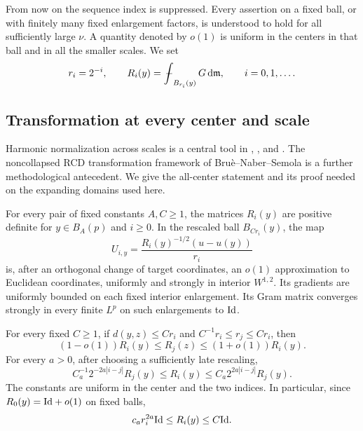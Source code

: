 From now on the sequence index is suppressed.  Every assertion on
a fixed ball, or with finitely many fixed enlargement factors, is
understood to hold for all sufficiently large \(\nu\).  A quantity
denoted by \(o(1)\) is uniform in the centers in that ball and in
all the smaller scales.  We set
\begin{equation}\label{co:dyadic-R}
 r_i=2^{-i},\qquad
 R_i(y)=\fint_{B_{r_i}(y)}G\dd\m,
 \qquad i=0,1,\ldots.
\end{equation}

\subsection{Transformation at every center and scale}

Harmonic normalization across scales is a central tool in
\cite[Theorem~1.32]{CN15}, \cite[Section~7]{CJN21}, and
\cite[Theorem~4.1]{HH24}. The noncollapsed RCD transformation framework of
Bru\`e--Naber--Semola \cite[Section~3.3, Proposition~3.13 and Corollary~3.16]{BNS20}
is a further methodological antecedent. We give the all-center statement and
its proof needed on the expanding domains used here.

\begin{lemma}\label{co:harmonic-normalization}
For every pair of fixed constants \(A,C\ge1\), the matrices \(R_i(y)\) are
positive definite for \(y\in B_A(p)\) and \(i\ge0\).  In the
rescaled ball \(B_{Cr_i}(y)\), the map
\begin{equation}\label{co:normalized-column}
 U_{i,y}=\frac{R_i(y)^{-1/2}(u-u(y))}{r_i}
\end{equation}
is, after an orthogonal change of target coordinates, an
\(o(1)\) approximation to Euclidean coordinates, uniformly and
strongly in interior \(W^{1,2}\).  Its gradients are uniformly
bounded on each fixed interior enlargement.  Its Gram matrix
converges strongly in every finite \(L^p\) on such enlargements
to \(\mathrm{Id}\).

For every fixed \(C\ge1\), if \(d(y,z)\le Cr_i\) and
\(C^{-1}r_i\le r_j\le Cr_i\), then
\begin{equation}\label{co:nearby-R}
 (1-o(1))R_i(y)\le R_j(z)\le(1+o(1))R_i(y).
\end{equation}
For every \(a>0\), after choosing a sufficiently late rescaling,
\begin{equation}\label{co:slow-R}
 C_a^{-1}2^{-2a|i-j|}R_j(y)
 \le R_i(y)\le C_a2^{2a|i-j|}R_j(y).
\end{equation}
The constants are uniform in the center and the two indices.  In
particular, since \(R_0(y)=\mathrm{Id}+o(1)\) on fixed balls,
\begin{equation}\label{co:R-lower}
 c_a r_i^{2a}\mathrm{Id}\le R_i(y)\le C\mathrm{Id}.
\end{equation}
\end{lemma}

